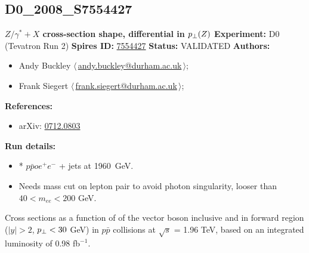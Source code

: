 \subsection[D0\_2008\_S7554427]{D0\_2008\_S7554427\,\cite{:2007nt}}
\textbf{$Z/\gamma^* + X$ cross-section shape, differential in $p_\perp(Z)$}\newline
\textbf{Experiment:} D0 (Tevatron Run 2) \newline
\textbf{Spires ID:} \href{http://www.slac.stanford.edu/spires/find/hep/www?rawcmd=key+7554427}{7554427}\newline
\textbf{Status:} VALIDATED\newline
\textbf{Authors:}
\begin{itemize}
  \item Andy Buckley $\langle\,$\href{mailto:andy.buckley@durham.ac.uk}{andy.buckley@durham.ac.uk}$\,\rangle$;
  \item Frank Siegert $\langle\,$\href{mailto:frank.siegert@durham.ac.uk}{frank.siegert@durham.ac.uk}$\,\rangle$;
\end{itemize}
\textbf{References:}
\begin{itemize}
  \item arXiv: \href{http://arxiv.org/abs/0712.0803}{0712.0803}
\end{itemize}
\textbf{Run details:}
\begin{itemize}

  \item * $p \bar{p} 	o e^+ e^-$ + jets at 1960~GeV.
  \item Needs mass cut on lepton pair to avoid photon singularity, looser than $40 < m_{ee} < 200$ GeV.\end{itemize}

\noindent Cross sections as a function of \pT of the vector boson inclusive and in forward region ($|y| > 2$, $p_\perp<30$ GeV) in $p \bar{p}$ collisions at $\sqrt{s}$ = 1.96 TeV, based on an integrated luminosity of 0.98 fb$^{-1}$.

\clearpage


\clearpage

